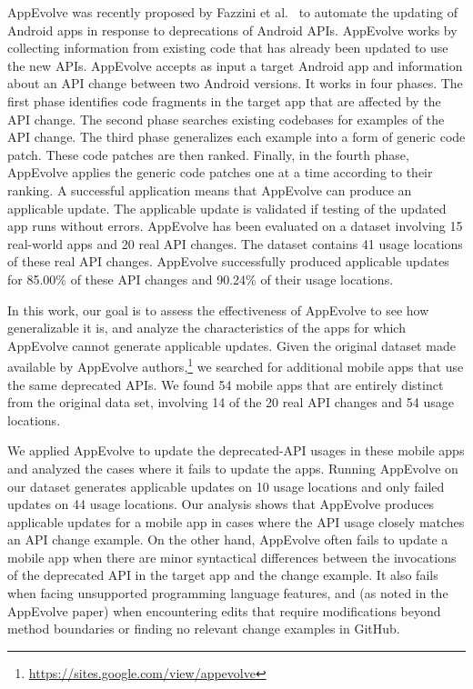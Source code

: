 AppEvolve was recently proposed by Fazzini et
al.~\cite{fazzini2019automated} to automate the updating of Android apps in
response to deprecations of Android APIs.  AppEvolve works by collecting
information from existing code that has already been updated to use the new
APIs.  AppEvolve accepts as input a target Android app and information
about an API change between two Android versions. It works in four
phases. The first phase identifies code fragments in the target app that
are affected by the API change. The second phase searches existing
codebases for examples of the API change. The third phase generalizes each
example into a form of generic code patch. These code patches are then
ranked. Finally, in the fourth phase, AppEvolve applies the generic code
patches one at a time according to their ranking. A successful application
means that AppEvolve can produce an applicable update. The applicable
update is validated if testing of the updated app runs without
errors. AppEvolve has been evaluated on a dataset involving 15 real-world
apps and 20 real API changes. The dataset contains 41 usage locations of
these real API changes. AppEvolve successfully produced applicable updates
for 85.00\% of these API changes and 90.24\% of their usage locations.

In this work, our goal is to assess the effectiveness of AppEvolve to see
how generalizable it is, and analyze the characteristics of the apps for
which AppEvolve cannot generate applicable updates.  Given the original
dataset made available by AppEvolve
authors,\footnote{\url{https://sites.google.com/view/appevolve}} we
searched for additional mobile apps that use the same deprecated APIs. We
found 54 mobile apps that are entirely distinct from the original data set,
involving 14 of the 20 real API changes and 54 usage locations.

We applied AppEvolve to update the deprecated-API usages in these mobile
apps and analyzed the cases where it fails to update the apps. Running
AppEvolve on our dataset generates applicable updates on 10 usage locations
and only failed updates on 44 usage locations. Our analysis shows that
AppEvolve produces applicable updates for a mobile app in cases where the
API usage closely matches an API change example.  On the other hand,
AppEvolve often fails to update a mobile app when there are minor
syntactical differences between the invocations of the deprecated API in
the target app and the change example.  It also fails when facing
unsupported programming language features, and (as noted in the AppEvolve
paper) when encountering edits that require modifications beyond method
boundaries or finding no relevant change examples in GitHub.

